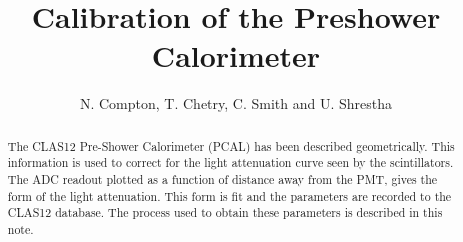 \documentclass[letterpaper,10pt]{article}
\title{Calibration of the Preshower Calorimeter}
\author{N. Compton, T. Chetry, C. Smith and U. Shrestha}
\begin{document}
\maketitle

\begin{abstract}
The CLAS12 Pre-Shower Calorimeter (PCAL) has been described geometrically. This information is used to correct 
for the light attenuation curve seen by the scintillators. The ADC readout plotted as a function of distance 
away from the PMT, gives the form of the light attenuation. This form is fit and the parameters are recorded 
to the CLAS12 database. The process used to obtain these parameters is described in this note.
\end{abstract} 


\tableofcontents
\clearpage



%


















\end{document}
